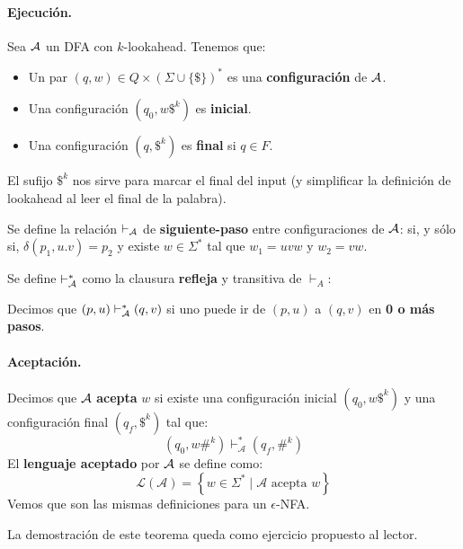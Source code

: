 \paragraph{Ejecución.} Sea $\mathcal{A}$ un DFA con $k$-lookahead. Tenemos que:
\begin{itemize}
    \item Un par $(q, w) \in Q \times(\Sigma \cup\{\$\})^*$ es una \textbf{configuración} de $\mathcal{A}$.
    \item Una configuración $(q_0, w\$^k)$ es \textbf{inicial}.
    \item Una configuración $(q, \$^k)$ es \textbf{final} si $q \in F$.
\end{itemize}

El sufijo $\$^k$ nos sirve para marcar el final del input (y simplificar la definición de lookahead al leer el final de la palabra). \medbreak

Se define la relación $\vdash_{\mathcal{A}}$ de \textbf{siguiente-paso} entre configuraciones de $\mathcal{A}$:
si, y sólo si, $\delta\left(p_1, u . v\right)=p_2$ y existe $w \in \Sigma^*$ tal que $w_1 = uvw$ y $w_2 = vw$. \medbreak

Se define $\vdash_{\mathcal{A}}^*$ como la clausura \textbf{refleja} y transitiva de $\vdash_A$:

Decimos que $(p,u) \vdash_{\mathcal{A}}^* (q,v)$ si uno puede ir de $(p,u)$ a $(q,v)$ en \textbf{0 o más pasos}.

\paragraph{Aceptación.} Decimos que $\mathcal{A}$ \textbf{acepta} $w$ si existe una configuración inicial $(q_0, w\$^k)$ y una configuración final $(q_f, \$^k)$ tal que:
$$
    \left(q_0, w \#^k\right) \vdash_{\mathcal{A}}^*\left(q_f, \#^k\right)
$$
El \textbf{lenguaje aceptado} por $\mathcal{A}$ se define como:
$$
    \mathcal{L}(\mathcal{A})=\left\{w \in \Sigma^* \mid \mathcal{A} \text { acepta } w\right\}
$$
Vemos que son las mismas definiciones para un $\epsilon$-NFA.

La demostración de este teorema queda como ejercicio propuesto al lector.

